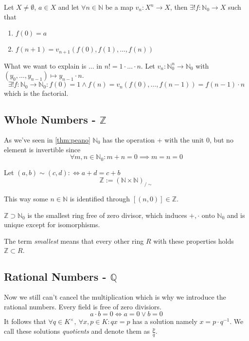 \begin{theorem}
   Let \(X \neq \emptyset\), \(a \in X\) and let \(\forall n \in \mathbb{N}\) be a map \(v_n: X^n \to X\), then \(\exists! f: \mathbb{N}_0 \to X\) such that
   \begin{enumerate}[label=\roman*, align=Center]
      \item \(f(0) = a\)
      \item \(f(n+1) = v_{n+1}(f(0), f(1), \ldots, f(n))\)
   \end{enumerate}
\end{theorem}
\begin{example}[Factorial]
   What we want to explain is \(\ldots\) in \(n! = 1 \cdot \ldots \cdot n\).
   Let \(v_n: \mathbb{N}_0^n \to \mathbb{N}_0\) with \((y_0, \ldots, y_{n-1}) \mapsto y_{n-1} \cdot n\).
   \[\exists! f: \mathbb{N}_0 \to \mathbb{N}_0: f(0) = 1 \land f(n) = v_n(f(0), \ldots, f(n-1)) = f(n-1) \cdot n\]
   which is the factorial.
\end{example}

\subsection{Whole Numbers - \texorpdfstring{\(\mathbb{Z}\)}{Z}}
As we've seen in \cref{thm:peano} \(\mathbb{N}_0\) has the operation \(+\) with the unit \(0\), but no element is invertible since
\[\forall m, n \in \mathbb{N}_0: m + n = 0 \implies m = n = 0\]

\begin{definition}
   Let \((a, b) \sim (c, d) :\iff a + d = c + b\)
   \[\mathbb{Z} := (\mathbb{N} \times \mathbb{N})_{/\sim}\]
\end{definition}
 \begin{remark}
    This way some \(n \in \mathbb{N}\) is identified through \([(n, 0)] \in \mathbb{Z}\).
 \end{remark}

\begin{theorem}
   \(\mathbb{Z} \supset \mathbb{N}_0\) is the smallest ring free of zero divisor, which induces \(+, \cdot\) onto \(\mathbb{N}_0\) and is unique except for isomorphisms.
\end{theorem}
\begin{remark}
   The term \emph{smallest} means that every other ring \(R\) with these properties holds \(\mathbb{Z} \subset R\).
\end{remark}

\subsection{Rational Numbers - \texorpdfstring{\(\mathbb{Q}\)}{Q}}
Now we still can't cancel the multiplication which is why we introduce the rational numbers.
Every field is free of zero divisiors.
\[a \cdot b = 0 \iff a = 0 \lor b = 0\]
It follows that \(\forall q \in K^\times,~\forall x, p \in K: qx = p\) has a solution namely \(x = p \cdot q^{-1}\).
We call these solutions \textit{quotients} and denote them as \(\frac{p}{q}\).

